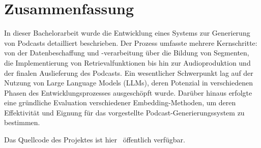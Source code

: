 \chapter{Zusammenfassung}\label{ch:summary}

In dieser Bachelorarbeit wurde die Entwicklung eines Systems zur Generierung von Podcasts detailliert beschrieben. 
Der Prozess umfasste mehrere Kernschritte: von der Datenbeschaffung und -verarbeitung über die Bildung von Segmenten, die Implementierung von Retrievalfunktionen bis hin zur Audioproduktion und der finalen Auslieferung des Podcasts. 
Ein wesentlicher Schwerpunkt lag auf der Nutzung von Large Language Models (LLMs), deren Potenzial in verschiedenen Phasen des Entwicklungsprozesses ausgeschöpft wurde. Darüber hinaus erfolgte eine gründliche Evaluation verschiedener Embedding-Methoden, um deren Effektivität und Eignung für das vorgestellte Podcast-Generierungssystem zu bestimmen.

Das Quellcode des Projektes ist hier~\cite{firevince2024} öffentlich verfügbar. 